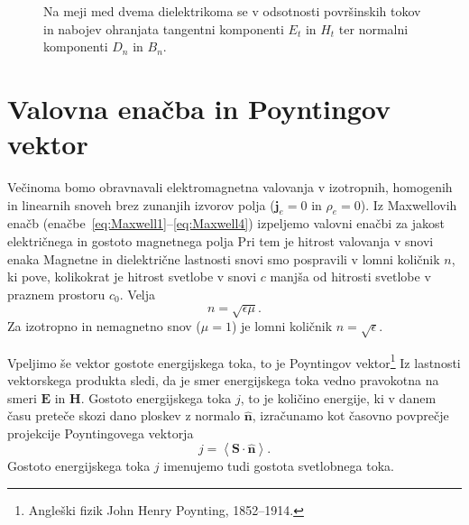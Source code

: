 \begin{figure}[h]
\centering
  \def\svgwidth{75truemm} 
  
\caption{Na meji med dvema dielektrikoma se v odsotnosti površinskih tokov
in nabojev ohranjata tangentni komponenti $E_t$ in $H_t$ ter 
normalni komponenti $D_n$ in $B_n$.}
\label{fig:Robni-pogoji}
\end{figure}

\section{Valovna enačba in Poyntingov vektor}
Večinoma bomo obravnavali elektromagnetna valovanja v izotropnih, 
homogenih in linearnih snoveh brez zunanjih izvorov polja ($\mathbf{j}_e=0$ in $\rho_{e}=0$). 
Iz Maxwellovih enačb (enačbe~\ref{eq:Maxwell1}--\ref{eq:Maxwell4}) izpeljemo valovni 
enačbi za jakost električnega in gostoto magnetnega polja 
Pri tem je hitrost valovanja v snovi enaka 
Magnetne in dielektrične lastnosti snovi smo pospravili
v lomni količnik $n$, ki pove, kolikokrat je hitrost 
svetlobe v snovi $c$ manjša od hitrosti svetlobe v praznem prostoru $c_0$. Velja
\begin{equation}
n=\sqrt{\epsilon\mu}.
\end{equation}
Za izotropno in nemagnetno snov ($\mu=1$) je lomni količnik $n=\sqrt{\epsilon}$.

Vpeljimo še vektor gostote energijskega toka, to je Poyntingov 
vektor\footnote{Angleški fizik John Henry Poynting, 1852--1914.} 
Iz lastnosti vektorskega produkta sledi, da je smer energijskega toka vedno pravokotna na 
smeri $\mathbf{E}$ in $\mathbf{H}$. Gostoto energijskega toka $j$, to je količino
energije, ki v danem času preteče skozi dano ploskev
z normalo $\mathbf{\hat{n}}$, izračunamo kot časovno povprečje projekcije
Poyntingovega vektorja 
\begin{equation}
j=\left\langle \mathbf{\mathbf{S}}\cdot\mathbf{\hat{n}}\right\rangle.
\label{eq:jscal}
\end{equation}
Gostoto energijskega toka $j$ imenujemo tudi gostota svetlobnega 
toka.

